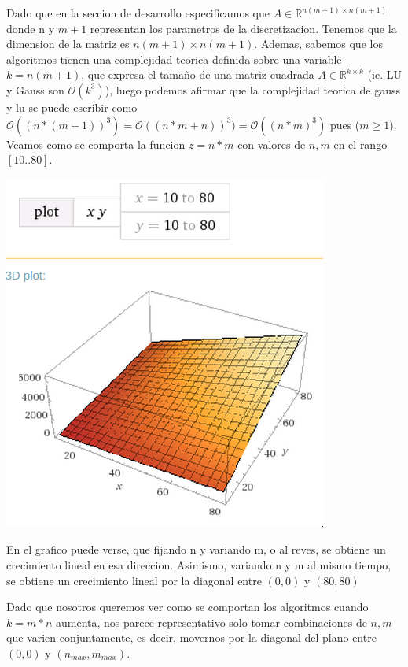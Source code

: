  Dado que en la seccion de desarrollo especificamos que $A \in \mathbb{R}^{n(m+1)\times n(m+1)}$ donde n y $m+1$ representan los parametros de la discretizacion. Tenemos que la dimension de la matriz es $n(m+1)\times n(m+1)$. Ademas, sabemos que los algoritmos tienen una complejidad teorica definida sobre una variable $k = n(m+1)$, que expresa el tamaño de una matriz cuadrada $A \in \mathbb{R}^{k\times k}$ (ie. LU y Gauss son $\mathcal{O}(k^3)$), luego podemos afirmar que la complejidad teorica de gauss y lu se puede escribir como $\mathcal{O}((n*(m+1))^3) = \mathcal{O}((n*m + n))^3) = \mathcal{O}((n*m)^3) $ pues ($m\geq1$). \\
 Veamos como se comporta la funcion $z = n*m$ con valores de $n, m$ en el rango $[10..80]$.\\

\begin{center}
\includegraphics[scale=0.65]{img/nTimesM-3dPlot.png}
\end{center}

En el grafico puede verse, que fijando n y variando m, o al reves, se obtiene un crecimiento lineal en esa direccion. Asimismo, variando n y m al mismo tiempo, se obtiene un crecimiento lineal por la diagonal entre $(0,0)$ y $(80,80)$

Dado que nosotros queremos ver como se comportan los algoritmos cuando $k = m*n$ aumenta, nos parece representativo solo tomar combinaciones de $n, m$ que varien conjuntamente, es decir, movernos por la diagonal del plano entre $(0, 0)$ y $(n_{max}, m_{max})$.
\vspace{0.3cm}

